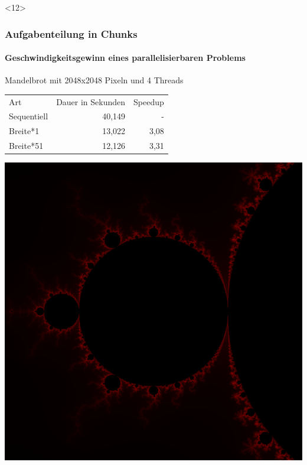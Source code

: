 \documentclass{beamer}
\begin{document}
\begin{frame}<12>
  \frametitle{Aufgabenteilung in Chunks}
  \framesubtitle{Geschwindigkeitsgewinn eines parallelisierbaren Problems}
  
  \begin{center}
    Mandelbrot mit 2048x2048 Pixeln und 4 Threads
  \end{center}
  
  \begin{center}
    \begin{table}[]
      \begin{tabular}{lrr}
        Art & Dauer in Sekunden & Speedup \\
        Sequentiell & 40,149 & - \\
        Breite*1 & 13,022 & 3,08 \\
        Breite*51 & 12,126 & 3,31
      \end{tabular}
    \end{table}
  \end{center}
  
  \begin{center}
    \includegraphics[scale=0.0625]{mandelbrot}
  \end{center}

\end{frame}
\end{document}
